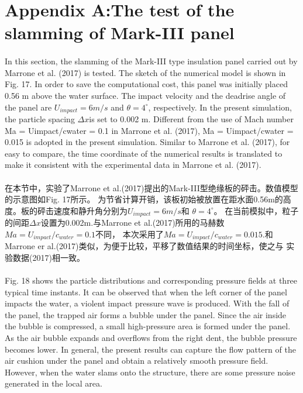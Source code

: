 \documentclass[UTF8]{ctexart}
\begin{document}
\section{Appendix A:The test of the slamming of Mark-III panel}
\paragraph{\quad}In this section, the slamming of the Mark-III type insulation panel carried 
                out by Marrone et al. (2017) is tested. The sketch of the numerical model is shown in Fig. 17. 
                In order to save the computational cost, this panel was initially placed 0.56 m above the water 
                surface. The impact velocity and the deadrise angle of the panel are $U_{impact} = 6m/s$ and $\theta = 4^\circ$,
                respectively. In the present simulation, the particle spacing $\Delta x $is set to 0.002 m. Different from 
                the use of Mach number Ma = Uimpact/cwater = 0.1 in Marrone et al. (2017), Ma = Uimpact/cwater = 0.015 
                is adopted in the present simulation. Similar to Marrone et al. (2017), for easy to compare, the time 
                coordinate of the numerical results is translated to make it consistent with the experimental data in 
                Marrone et al. (2017).
\paragraph{\quad}在本节中，实验了Marrone et al.(2017)提出的Mark-III型绝缘板的砰击。数值模型的示意图如Fig. 17所示。
                为节省计算开销，该板初始被放置在距水面0.56m的高度。板的砰击速度和静升角分别为$U_{impact} = 6m/s$和 $\theta = 4^\circ$。
                在当前模拟中，粒子的间距$\Delta x$设置为0.002m.与Marrone et al.(2017)所用的马赫数$Ma=U_{impact}/c_{water}=0.1$不同，
                本次采用了$Ma=U_{impact}/c_{water}=0.015$.和Marrone er al.(2017)类似，为便于比较，平移了数值结果的时间坐标，使之与
                实验数据(2017)相一致。

\paragraph{\quad}Fig. 18 shows the particle distributions and corresponding pressure fields at three 
                typical time instants. It can be observed that when the left corner of the panel impacts 
                the water, a violent impact pressure wave is produced. With the fall of the panel, the 
                trapped air forms a bubble under the panel. Since the air inside the bubble is compressed, 
                a small high-pressure area is formed under the panel. As the air bubble expands and overflows 
                from the right dent, the bubble pressure becomes lower. In general, the present results can 
                capture the flow pattern of the air cushion under the panel and obtain a relatively smooth 
                pressure field. However, when the water slams onto the structure, there are some pressure 
                noise generated in the local area.
\end{document}
